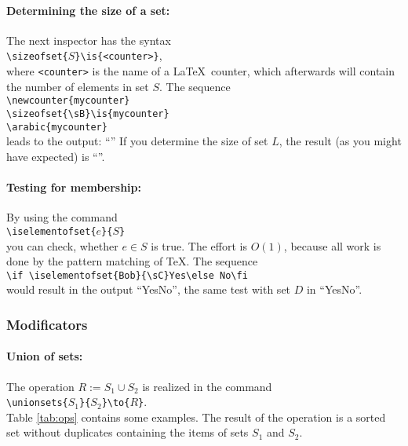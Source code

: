 \paragraph{Determining the size of a set:} The next inspector has the syntax\\
\mbox{}\hspace{2em}\verb$\sizeofset{$$S$\verb$}\is{<counter>}$,\\
where \texttt{<counter>} is the name of a \LaTeX\ counter, which afterwards will contain the number of elements in set $S$. The sequence\\
\mbox{}\hspace{2em}\verb$\newcounter{mycounter}$\\
\mbox{}\hspace{2em}\verb$\sizeofset{\sB}\is{mycounter}$\sizeofset{\sB}\\
\mbox{}\hspace{2em}\verb$\arabic{mycounter}$\\
leads to the output: ``''
If you determine the size of set $L$, the result\sizeofset{\sL} (as you might have expected) is ``''.

\paragraph{Testing for membership:}By using the command\\
\mbox{}\hspace{2em}\verb$\iselementofset{$$e$\verb$}{$$S$\verb$}$\\
you can check, whether $e \in S$ is true. The effort is $O(1)$, because all work is done by the pattern matching of \TeX. The sequence\\
\mbox{}\hspace{2em}\verb$\if \iselementofset{Bob}{\sC}Yes\else No\fi$\\
would result in the output ``\if {}Yes\else No\fi'', the same test with set $D$ in ``\if {}Yes\else No\fi''.

\subsubsection{Modificators}\label{modificators}

\paragraph{Union of sets:}The operation $R := S_1 \cup S_2$ is realized in the command\\
\mbox{}\hspace{2em}\verb|\unionsets{|$S_1$\verb|}{|$S_2$\verb|}\to{|$R$\verb|}|.\\
Table \ref{tab:ops} contains some examples. The result of the operation is a sorted set without duplicates containing the items of sets $S_1$ and $S_2$.


